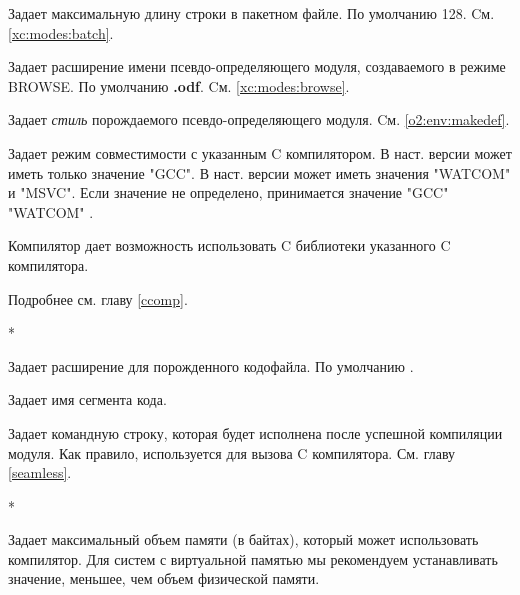 \begin{description}
Задает максимальную длину строки в пакетном файле.
По умолчанию 128.
        Cм. \ref{xc:modes:batch}.

        \MLBegin{}\ModeB{}\MLEnd{}

Задает расширение имени псевдо-определяющего модуля, создаваемого
в режиме BROWSE. 
По умолчанию {\bf .odf}.
        Cм. \ref{xc:modes:browse}.

        \MLBegin{}\ModeB{}\MLEnd{}

Задает {\em стиль} порождаемого псевдо-определяющего модуля.
Cм. \ref{o2:env:makedef}.

\ifgencode
{}
        \MLBegin{}\ModeC{}\MLEnd{}

Задает режим совместимости с указанным C компилятором.
\iflinux
        В наст. версии может иметь только значение "GCC".
\else
        В наст. версии может иметь значения "WATCOM" и "MSVC".
\fi
Если значение не определено, принимается значение
        \iflinux "GCC" \else "WATCOM" \fi.

Компилятор дает возможность использовать C библиотеки указанного 
C компилятора.

Подробнее см. главу \ref{ccomp}.

\fi

\ifgenc
{}
\else %
\fi
        \MLBegin{}*\MLEnd{}

Задает расширение для порожденного кодофайла.
По умолчанию {\bf \Code}.

\ifgencode
{}
        \MLBegin{}\ModeC{}\MLEnd{} \header

Задает имя сегмента кода.
\fi

\ifcomment
{}
        \MLBegin{}\ModeC{}\MLEnd{}

Задает командную строку, которая будет исполнена после успешной
компиляции модуля. Как правило, используется для вызова C компилятора.
См. главу \ref{seamless}.
\fi

        \MLBegin{}*\MLEnd{}

Задает максимальный объем памяти (в байтах), который может
использовать компилятор. Для систем с виртуальной памятью
мы рекомендуем устанавливать значение, меньшее, чем объем 
физической памяти.


\end{description}
